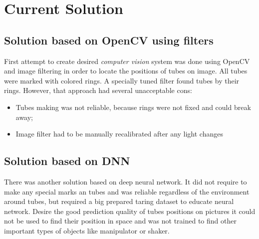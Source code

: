 \section{Current Solution}

\subsection{Solution based on OpenCV using filters}

First attempt to create desired \textit{computer vision} system was done using OpenCV and image filtering
in order to locate the positions of tubes on image. All tubes were marked with colored rings.
A specially tuned filter found tubes by their rings. However, that approach had several unacceptable cons:
\begin{itemize}
	\item Tubes making was not reliable, because rings were not fixed and could break away;
	\item Image filter had to be manually recalibrated after any light changes 
\end{itemize}

\subsection{Solution based on DNN}

There was another solution based on deep neural network. It did not require to make any special marks
an tubes and was reliable regardless of the environment around tubes, but required a big prepared taring dataset
to educate neural network. Desire the good prediction quality of tubes positions on pictures it could not be
used to find their position in space and was not trained to find other important types of objects like manipulator or shaker.

 
